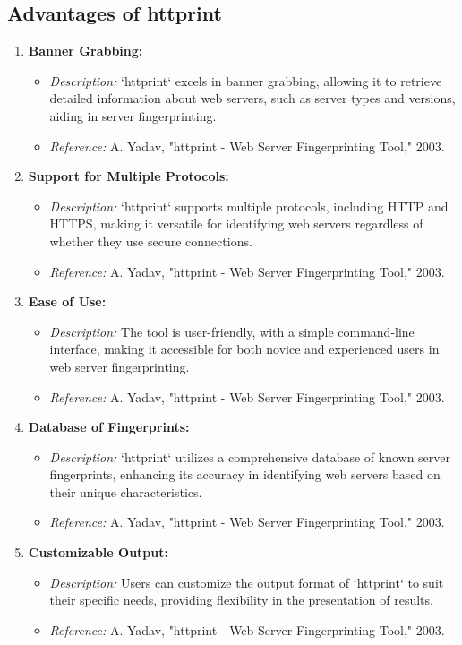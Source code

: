 \documentclass[11pt]{article}
\begin{document}
\subsection{Advantages of httprint}
\begin{enumerate}
    \item \textbf{Banner Grabbing:}
    \begin{itemize}
        \item \textit{Description:} `httprint` excels in banner grabbing, allowing it to retrieve detailed information about web servers, such as server types and versions, aiding in server fingerprinting.
        \item \textit{Reference:} A. Yadav, "httprint - Web Server Fingerprinting Tool," 2003.
    \end{itemize}

    \item \textbf{Support for Multiple Protocols:}
    \begin{itemize}
        \item \textit{Description:} `httprint` supports multiple protocols, including HTTP and HTTPS, making it versatile for identifying web servers regardless of whether they use secure connections.
        \item \textit{Reference:} A. Yadav, "httprint - Web Server Fingerprinting Tool," 2003.
    \end{itemize}

    \item \textbf{Ease of Use:}
    \begin{itemize}
        \item \textit{Description:} The tool is user-friendly, with a simple command-line interface, making it accessible for both novice and experienced users in web server fingerprinting.
        \item \textit{Reference:} A. Yadav, "httprint - Web Server Fingerprinting Tool," 2003.
    \end{itemize}

    \item \textbf{Database of Fingerprints:}
    \begin{itemize}
        \item \textit{Description:} `httprint` utilizes a comprehensive database of known server fingerprints, enhancing its accuracy in identifying web servers based on their unique characteristics.
        \item \textit{Reference:} A. Yadav, "httprint - Web Server Fingerprinting Tool," 2003.
    \end{itemize}

    \item \textbf{Customizable Output:}
    \begin{itemize}
        \item \textit{Description:} Users can customize the output format of `httprint` to suit their specific needs, providing flexibility in the presentation of results.
        \item \textit{Reference:} A. Yadav, "httprint - Web Server Fingerprinting Tool," 2003.
    \end{itemize}
\end{enumerate}
\end{document}
